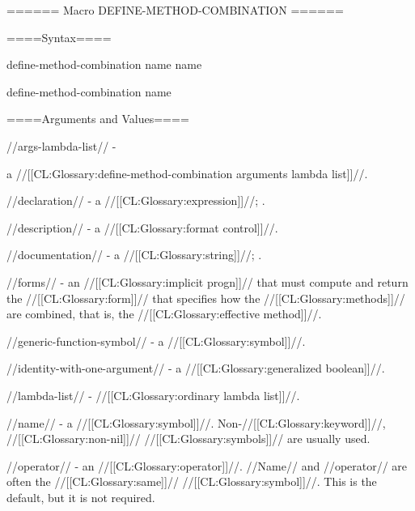 ====== Macro DEFINE-METHOD-COMBINATION ======


====Syntax====



\DefmacWithValuesNewline define-method-combination {name } {name}

\DefmacWithValuesNewline define-method-combination {} {name}

  

====Arguments and Values====

//args-lambda-list// -

a //[[CL:Glossary:define-method-combination arguments lambda list]]//.

//declaration// - a  //[[CL:Glossary:expression]]//; \noeval.

//description// - a //[[CL:Glossary:format control]]//.

//documentation// - a //[[CL:Glossary:string]]//; \noeval.

//forms// - an //[[CL:Glossary:implicit progn]]// that must compute and return the //[[CL:Glossary:form]]// that specifies how the //[[CL:Glossary:methods]]// are combined, that is, the //[[CL:Glossary:effective method]]//.

//generic-function-symbol// - a //[[CL:Glossary:symbol]]//.

//identity-with-one-argument// - a //[[CL:Glossary:generalized boolean]]//.

//lambda-list// - //[[CL:Glossary:ordinary lambda list]]//.

//name// - a //[[CL:Glossary:symbol]]//. Non-//[[CL:Glossary:keyword]]//, //[[CL:Glossary:non-nil]]// //[[CL:Glossary:symbols]]// are usually used.

//operator// - an //[[CL:Glossary:operator]]//. //Name// and //operator// are often the //[[CL:Glossary:same]]// //[[CL:Glossary:symbol]]//. This is the default, but it is not required.

